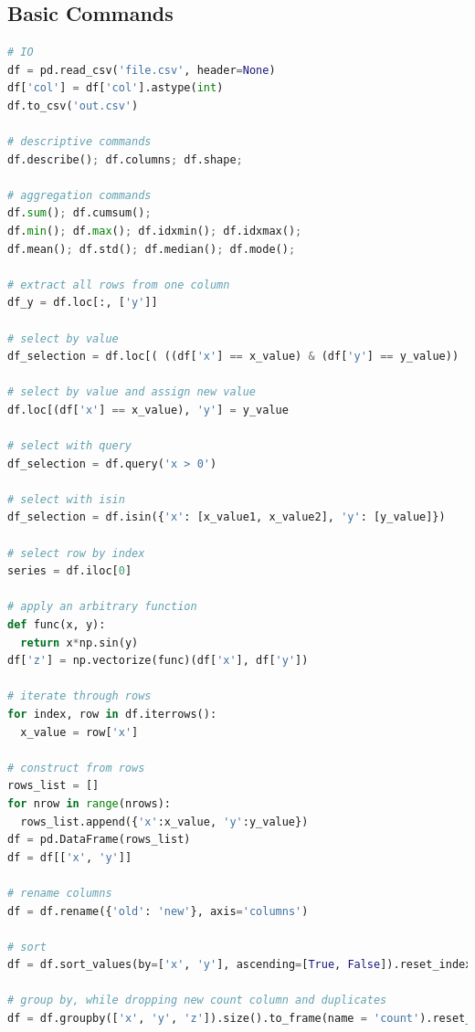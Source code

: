 \chapter{\pandas}
\label{pandas}

\section{Basic Commands}
\label{pandas:basic}

\begin{lstlisting}[language=Python]
# IO
df = pd.read_csv('file.csv', header=None)
df['col'] = df['col'].astype(int)
df.to_csv('out.csv')

# descriptive commands
df.describe(); df.columns; df.shape;

# aggregation commands
df.sum(); df.cumsum();
df.min(); df.max(); df.idxmin(); df.idxmax();
df.mean(); df.std(); df.median(); df.mode();

# extract all rows from one column
df_y = df.loc[:, ['y']]

# select by value
df_selection = df.loc[( ((df['x'] == x_value) & (df['y'] == y_value)) | (df['z'] > z_value))]

# select by value and assign new value
df.loc[(df['x'] == x_value), 'y'] = y_value

# select with query
df_selection = df.query('x > 0')

# select with isin
df_selection = df.isin({'x': [x_value1, x_value2], 'y': [y_value]})

# select row by index
series = df.iloc[0]

# apply an arbitrary function
def func(x, y):
  return x*np.sin(y)
df['z'] = np.vectorize(func)(df['x'], df['y'])

# iterate through rows
for index, row in df.iterrows():
  x_value = row['x']

# construct from rows
rows_list = []
for nrow in range(nrows):
  rows_list.append({'x':x_value, 'y':y_value})
df = pd.DataFrame(rows_list)
df = df[['x', 'y']]

# rename columns
df = df.rename({'old': 'new'}, axis='columns')

# sort
df = df.sort_values(by=['x', 'y'], ascending=[True, False]).reset_index(drop=True)

# group by, while dropping new count column and duplicates
df = df.groupby(['x', 'y', 'z']).size().to_frame(name = 'count').reset_index().drop(['count'], axis=1).drop_duplicates()


\end{lstlisting}
